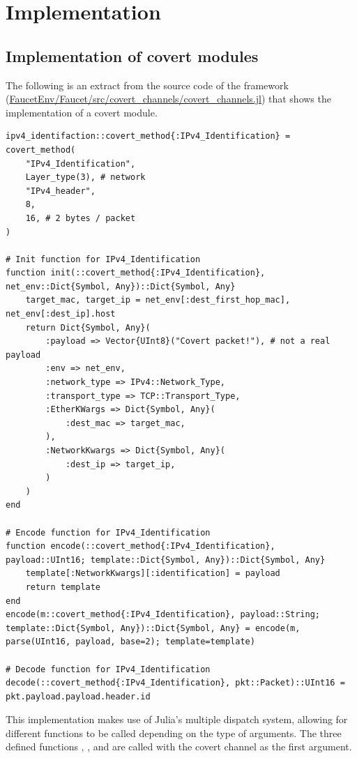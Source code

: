 \chapter{Implementation}

\section{Implementation of covert modules}
\label{sec:impl_cov_mod}

The following is an extract from the source code of the framework (\url{FaucetEnv/Faucet/src/covert_channels/covert_channels.jl}) that shows the implementation of a covert module.

\begin{lstlisting}[language=JuliaLocal, style=julia]
ipv4_identifaction::covert_method{:IPv4_Identification} = covert_method(
    "IPv4_Identification",
    Layer_type(3), # network
    "IPv4_header",
    8,
    16, # 2 bytes / packet
)

# Init function for IPv4_Identification
function init(::covert_method{:IPv4_Identification}, net_env::Dict{Symbol, Any})::Dict{Symbol, Any}
    target_mac, target_ip = net_env[:dest_first_hop_mac], net_env[:dest_ip].host
    return Dict{Symbol, Any}(
        :payload => Vector{UInt8}("Covert packet!"), # not a real payload
        :env => net_env,
        :network_type => IPv4::Network_Type,
        :transport_type => TCP::Transport_Type,
        :EtherKWargs => Dict{Symbol, Any}(
            :dest_mac => target_mac,
        ),
        :NetworkKwargs => Dict{Symbol, Any}(
            :dest_ip => target_ip,
        )
    )
end

# Encode function for IPv4_Identification
function encode(::covert_method{:IPv4_Identification}, payload::UInt16; template::Dict{Symbol, Any})::Dict{Symbol, Any}
    template[:NetworkKwargs][:identification] = payload
    return template
end
encode(m::covert_method{:IPv4_Identification}, payload::String; template::Dict{Symbol, Any})::Dict{Symbol, Any} = encode(m, parse(UInt16, payload, base=2); template=template)

# Decode function for IPv4_Identification
decode(::covert_method{:IPv4_Identification}, pkt::Packet)::UInt16 = pkt.payload.payload.header.id
\end{lstlisting}

This implementation makes use of Julia's multiple dispatch system, allowing for different functions to be called depending on the type of arguments. The three defined functions , , and  are called with the covert channel as the first argument.

